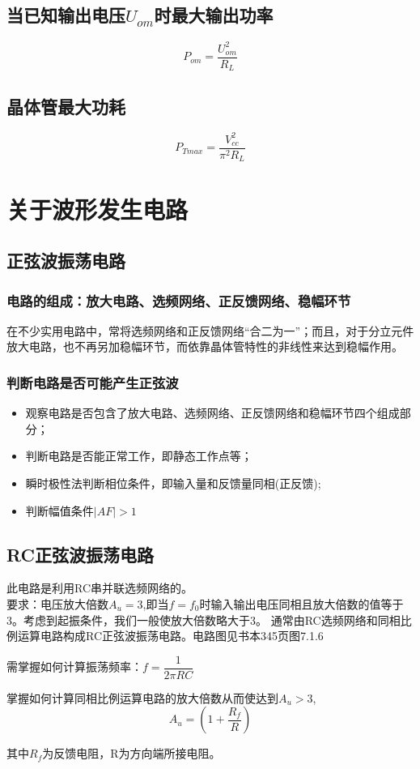 \documentclass[cn,11pt]{elegantbook}
\begin{document}
\subsection{当已知输出电压$U_{om}$时最大输出功率}
$$P_{om}=\dfrac{U_{om}^{2}}{R_{L}}$$
\subsection{晶体管最大功耗}
$$P_{Tmax}=\dfrac{V_{cc}^{2}}{\pi^{2}R_{L}}$$
\section{关于波形发生电路}
\subsection{正弦波振荡电路}
\subsubsection{电路的组成：放大电路、选频网络、正反馈网络、稳幅环节}
{\large 
	
	在不少实用电路中，常将选频网络和正反馈网络“合二为一”；而且，对于分立元件放大电路，也不再另加稳幅环节，而依靠晶体管特性的非线性来达到稳幅作用。
}
\subsubsection{判断电路是否可能产生正弦波}
\begin{itemize}
	\item 观察电路是否包含了放大电路、选频网络、正反馈网络和稳幅环节四个组成部分；
	
	\item 判断电路是否能正常工作，即静态工作点等；
	
	\item 瞬时极性法判断相位条件，即输入量和反馈量同相(正反馈);
	
	\item 判断幅值条件$|AF|>1$
\end{itemize}
\subsection{RC正弦波振荡电路}
{\large 
	此电路是利用RC串并联选频网络的。\\	
	要求：电压放大倍数$A_{u}=3$,即当$f=f_{0}$时输入输出电压同相且放大倍数的值等于3。考虑到起振条件，我们一般使放大倍数略大于3。
通常由RC选频网络和同相比例运算电路构成RC正弦波振荡电路。电路图见书本345页图7.1.6

需掌握如何计算振荡频率：$f=\dfrac{1}{2\pi RC}$

掌握如何计算同相比例运算电路的放大倍数从而使达到$A_{u}>3$,$$A_{u}=(1+\dfrac{R_{f}}{R})$$

其中$R_{f}$为反馈电阻，R为方向端所接电阻。
}
\end{document}
